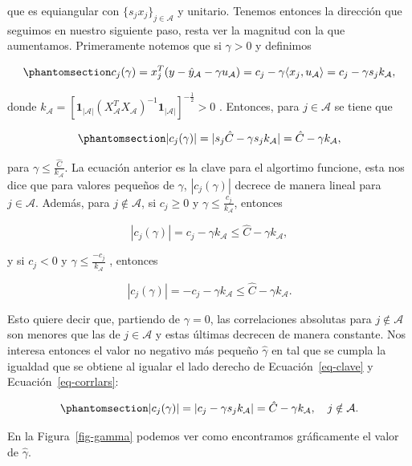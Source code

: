 \documentclass[
  letterpaper,
  DIV=11,
  numbers=noendperiod]{scrreprt}
\theoremstyle{definition}
\theoremstyle{plain}
\theoremstyle{remark}
\begin{document}
que es equiangular con \(\{s_jx_j\}_{j\in \mathcal A}\) y unitario.
Tenemos entonces la dirección que seguimos en nuestro siguiente paso,
resta ver la magnitud con la que aumentamos. Primeramente notemos que si
\(\gamma>0\) y definimos

\begin{equation}\phantomsection\label{eq-corrlars}{
c_j(\gamma)=x_j^T(y-\hat y_\mathcal A -\gamma u_\mathcal A)=c_j-\gamma\langle x_j,u_\mathcal A\rangle=c_j-\gamma s_jk_{\mathcal A},
}\end{equation}

donde
\(k_{\mathcal A}=[\mathbf 1_{|\mathcal A|}(X^T_{\mathcal A}X_{\mathcal A})^{-1}\mathbf 1_{|\mathcal A|}]^{-\frac 12}>0\)
. Entonces, para \(j\in \mathcal A\) se tiene que

\begin{equation}\phantomsection\label{eq-clave}{
|c_j(\gamma)|=|s_j \hat C-\gamma s_jk_{\mathcal A}|= \hat C-\gamma k_{\mathcal A},
}\end{equation}

para \(\gamma\leq \frac{\hat C}{k_\mathcal A}\). La ecuación anterior es
la clave para el algortimo funcione, esta nos dice que para valores
pequeños de \(\gamma\), \(|c_j(\gamma)|\) decrece de manera lineal para
\(j\in \mathcal A\). Además, para \(j\notin \mathcal A\), si
\(c_j\geq 0\) y \(\gamma\leq \frac{c_j}{k_\mathcal A}\), entonces

\[
|c_j(\gamma)|=c_j-\gamma k_{\mathcal A}\leq \hat C-\gamma k_{\mathcal A},
\]

y si \(c_j<0\) y \(\gamma\leq \frac{-c_j}{k_{\mathcal A}}\) , entonces

\[
|c_j(\gamma)|=-c_j-\gamma k_\mathcal A\leq \hat C-\gamma k_\mathcal A.
\]

Esto quiere decir que, partiendo de \(\gamma=0\), las correlaciones
absolutas para \(j\notin \mathcal A\) son menores que las de
\(j\in \mathcal A\) y estas últimas decrecen de manera constante. Nos
interesa entonces el valor no negativo más pequeño \(\hat \gamma\) en
tal que se cumpla la igualdad que se obtiene al igualar el lado derecho
de Ecuación~\ref{eq-clave} y Ecuación~\ref{eq-corrlars}:

\begin{equation}\phantomsection\label{eq-gamma}{
|c_j(\gamma)|=|c_j-\gamma s_j k_\mathcal A|=\hat C-\gamma k_\mathcal A,\quad j\notin \mathcal A.
}\end{equation}

En la Figura~\ref{fig-gamma} podemos ver como encontramos gráficamente
el valor de \(\hat\gamma\).
\end{document}

